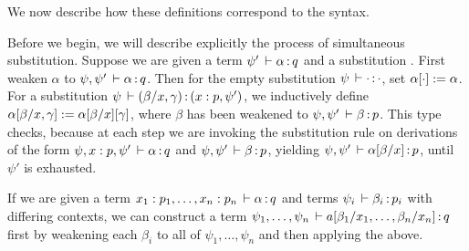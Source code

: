 We now describe how these definitions correspond to the syntax.

Before we begin, we will describe explicitly the process of simultaneous substitution. Suppose we are given a term $\psi' \, \vdash \alpha \, \mathit{:} \, q$ 
and a substitution .  First weaken $\alpha$ to $\psi, \psi' \, \vdash \alpha \, \mathit{:} \, q$. Then for the empty substitution $\psi \, \vdash \cdot \, \mathit{:} \, \cdot$, set $\alpha[\cdot] := \alpha$. For a substitution $\psi \, \vdash (\beta/x, \gamma) \, \mathit{:} \, (x:p, \psi')$, we inductively define $\alpha[\beta/x,\gamma] := \alpha[\beta/x][\gamma]$, where $\beta$ has been weakened to $\psi, \psi' \, \vdash \beta \, \mathit{:} \, p$. This type checks, because at each step we are invoking the substitution rule on derivations of the form $\psi, x:p, \psi' \, \vdash \alpha \, \mathit{:} \, q$ and $\psi, \psi' \, \vdash \beta \, \mathit{:} \, p$, yielding $\psi, \psi' \, \vdash \alpha[\beta/x] \, \mathit{:} \, p$, until $\psi'$ is exhausted.

If we are given a term $x_1:p_1, \dots, x_n:p_n \, \vdash \alpha \, \mathit{:} \, q$ and terms $\psi_i \, \vdash \beta_i \, \mathit{:} \, p_i$ with differing contexts, we can construct a term $\psi_1, \dots, \psi_n \, \vdash a[\beta_1/x_1, \dots, \beta_n/x_n] \, \mathit{:} \, q$ first by weakening each $\beta_i$ to all of $\psi_1, \dots, \psi_n$ and then applying the above.

